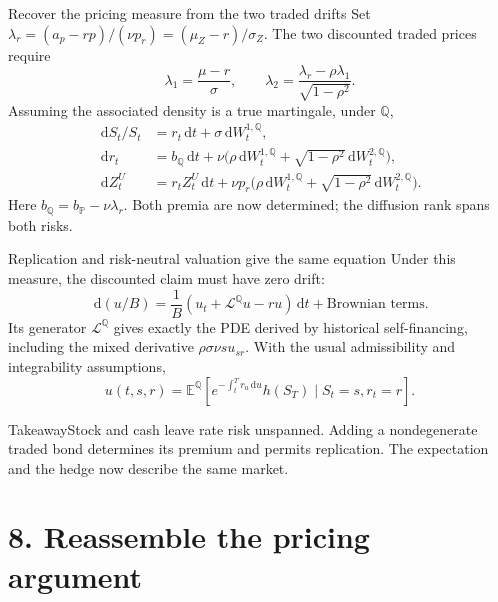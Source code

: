 \documentclass[handout,10pt,t,aspectratio=169]{beamer}
\newenvironment{keybox}{\begin{exampleblock}{Takeaway}}{\end{exampleblock}}
\newcommand{\E}{\mathbb E}
\newcommand{\Q}{\mathbb Q}
\newcommand{\Pp}{\mathbb P}
\newcommand{\dd}{\,\mathrm d}
\begin{document}
\begin{frame}{Recover the pricing measure from the two traded drifts}
\small
Set \(\lambda_r=(a_p-rp)/(\nu p_r)=(\mu_Z-r)/\sigma_Z\).
The two discounted traded prices require
\[
 \boxed{\lambda_1=\frac{\mu-r}{\sigma},\qquad
 \lambda_2=\frac{\lambda_r-\rho\lambda_1}{\sqrt{1-\rho^2}}.}
\]
Assuming the associated density is a true martingale, under \(\Q\),
\[
 \begin{aligned}
 \dd S_t/S_t&=r_t\dd t+\sigma\dd W_t^{1,\Q},\\
 \dd r_t&=b_\Q\dd t+
 \nu\bigl(\rho\dd W_t^{1,\Q}+\sqrt{1-\rho^2}\dd W_t^{2,\Q}\bigr),\\
 \dd Z_t^U&=r_tZ_t^U\dd t+
 \nu p_r\bigl(\rho\dd W_t^{1,\Q}+\sqrt{1-\rho^2}\dd W_t^{2,\Q}\bigr).
 \end{aligned}
\]
Here \(b_\Q=b_\Pp-\nu\lambda_r\).
Both premia are now determined; the diffusion rank spans both risks.
\end{frame}

\begin{frame}{Replication and risk-neutral valuation give the same equation}
\small
Under this measure, the discounted claim must have zero drift:
\[
 \dd(u/B)=\frac1B\left(u_t+\mathcal L^\Q u-ru\right)\dd t
          +\text{Brownian terms}.
\]
Its generator \(\mathcal L^\Q\) gives exactly the PDE derived by historical
self-financing, including the mixed derivative \(\rho\sigma\nu s u_{sr}\).
With the usual admissibility and integrability assumptions,
\[
 \boxed{u(t,s,r)=\E^\Q\!\left[
 e^{-\int_t^T r_u\dd u}h(S_T)\mid S_t=s,r_t=r\right].}
\]
\begin{keybox}Stock and cash leave rate risk unspanned.
Adding a nondegenerate traded bond determines its premium and permits replication.
The expectation and the hedge now describe the same market.
\end{keybox}
\end{frame}

\section{8. Reassemble the pricing argument}
\end{document}
